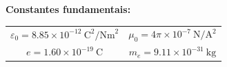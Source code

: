 \documentclass[11pt,a4paper,final,addpoints]{exam}
\begin{document}
\noindent\textbf{Constantes fundamentais:}
\begin{center}
\begin{tabular}{cc}
$\varepsilon_0 = 8.85\times10^{-12}~\text{C}^2/\text{Nm}^2$ & $\mu_0 = 4\pi\times10^{-7}~\text{N}/\text{A}^2$ \\ 
$e=1.60\times10^{-19}~\text{C}$ & $m_e=9.11\times10^{-31}~\text{kg}$ \\ 
\end{tabular} 
\end{center}


\boxedpoints
\pointsinmargin
\newpage
\begin{questions}
%
%
%



\newpage


\end{questions}
\end{document}
